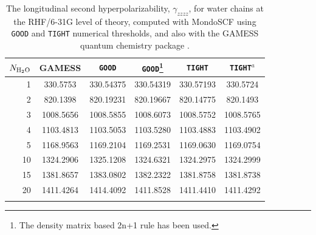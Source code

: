 \documentclass[prl,aps,preprint,showpacs,superbib]{revtex4}
\begin{document}
{\begin{table}[h]
  \centering
  \caption{\protect
    The longitudinal second hyperpolarizability, $\gamma_{zzzz}$,
    for water chains at the RHF/6-31G level of theory, computed with 
    {\sc MondoSCF} using {\tt GOOD} and {\tt TIGHT} numerical thresholds, 
    and also with the {\sc GAMESS} quantum chemistry package \cite{gamess}.
  }\label{tab:Gamma_1D_Values}
  \begin{tabular}{rccccc}
    \toprule
    $N_{\rm H_2 O}$ &\multicolumn{1}{c}{{\sc GAMESS}}
    &\multicolumn{1}{c}{{\tt GOOD}}
    &\multicolumn{1}{c}{{\tt GOOD}\footnote[1]{The density matrix based 2n+1 rule has been used.}}
    &\multicolumn{1}{c}{{\tt TIGHT}}
    &\multicolumn{1}{c}{{\tt TIGHT}$^a$} \\
    \hline
     1 &  330.5753 & 330.54375 & 330.54319 & 330.57193 &  330.5724 \\
     2 &  820.1398 & 820.19231 & 820.19667 & 820.14775 &  820.1493 \\
     3 & 1008.5656 & 1008.5855 & 1008.6073 & 1008.5752 & 1008.5765 \\
     4 & 1103.4813 & 1103.5053 & 1103.5280 & 1103.4883 & 1103.4902 \\
     5 & 1168.9563 & 1169.2104 & 1169.2531 & 1169.0630 & 1169.0754 \\
    10 & 1324.2906 & 1325.1208 & 1324.6321 & 1324.2975 & 1324.2999 \\
    15 & 1381.8657 & 1383.0802 & 1382.2322 & 1381.8758 & 1381.8738 \\
    20 & 1411.4264 & 1414.4092 & 1411.8528 & 1411.4410 & 1411.4292 \\
    \botrule
  \end{tabular}
\end{table}



}
\end{document}
